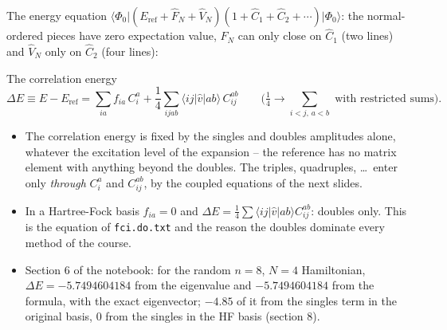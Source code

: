 \documentclass[aspectratio=169,10pt]{beamer}
\newcommand{\ket}[1]{\vert #1\rangle}
\newcommand{\bra}[1]{\langle #1\vert}
\newcommand{\element}[3]{\langle #1\vert #2\vert #3\rangle}
\begin{document}
\begin{frame}{The energy equation}
  \small
  $\bra{\Phi_0}(E_{\mathrm{ref}}+\hat{F}_N+\hat{V}_N)(1+\hat{C}_1+\hat{C}_2+\cdots)\ket{\Phi_0}$: the normal-ordered pieces have zero expectation value, $\hat{F}_N$ can only close on $\hat{C}_1$ (two lines) and $\hat{V}_N$ only on $\hat{C}_2$ (four lines):
  \begin{block}{The correlation energy}
    \[
      \Delta E\equiv E-E_{\mathrm{ref}}=\sum_{ia}f_{ia}\,C_i^a+\frac14\sum_{ijab}\element{ij}{\hat{v}}{ab}\,C_{ij}^{ab}
      \qquad\text{(}\tfrac14\to\sum_{i<j,\,a<b}\text{ with restricted sums).}
    \]
  \end{block}
  \begin{itemize}
    \item The correlation energy is fixed by the \alert{singles and doubles amplitudes alone}, whatever the excitation level of the expansion -- the reference has no matrix element with anything beyond the doubles. The triples, quadruples, \dots\ enter only \emph{through} $C_i^a$ and $C_{ij}^{ab}$, by the coupled equations of the next slides.
    \item In a Hartree-Fock basis $f_{ia}=0$ and $\Delta E=\frac14\sum\element{ij}{\hat{v}}{ab}C_{ij}^{ab}$: doubles only. This is the equation of \texttt{fci.do.txt} and the reason the doubles dominate every method of the course.
    \item Section 6 of the notebook: for the random $n=8$, $N=4$ Hamiltonian, $\Delta E=-5.7494604184$ from the eigenvalue and $-5.7494604184$ from the formula, with the exact eigenvector; $-4.85$ of it from the singles term in the original basis, $0$ from the singles in the HF basis (section 8).
  \end{itemize}
\end{frame}
\end{document}
